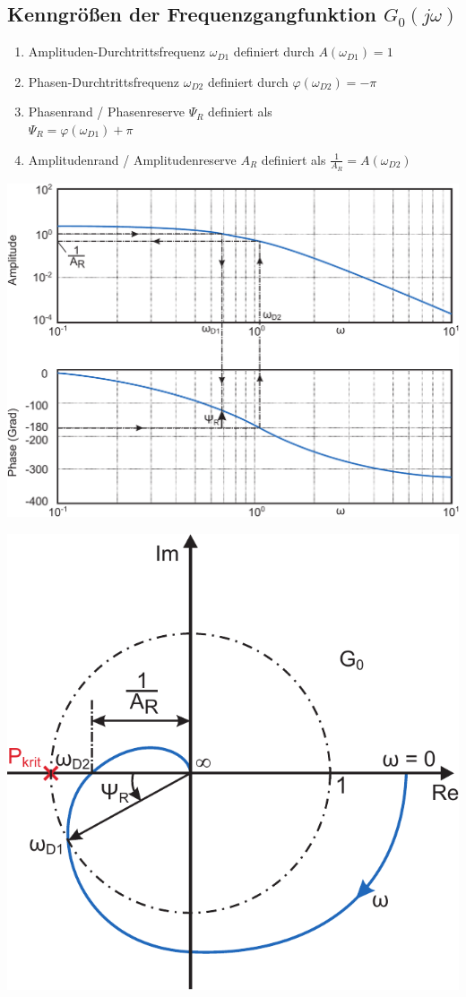 \documentclass[a4paper,twocolumn,10pt]{article}
\begin{document}
\subsection{Kenngrößen der Frequenzgangfunktion $G_0(j\omega)$}
\begin{enumerate}[label=$\bullet$]
\item Amplituden-Durchtrittsfrequenz $\omega_{D1}$ definiert durch $A(\omega_{D1})=1$
\item Phasen-Durchtrittsfrequenz $\omega_{D2}$ definiert durch $\varphi(\omega_{D2})=-\pi$
\item Phasenrand / Phasenreserve $\Psi_R$ definiert als\\
$\Psi_R=\varphi(\omega_{D1})+\pi$
\item Amplitudenrand / Amplitudenreserve $A_R$ definiert als $\frac{1}{A_R}=A(\omega_{D2})$
\end{enumerate}
\begin{center}
\includegraphics[width=0.95\columnwidth]{Grafiken/Kenngroessen_Bodediagramm}
\end{center}
\begin{center}
\includegraphics[width=0.6\columnwidth]{Grafiken/Kenngroessen_Ortskurve}
\end{center}
\end{document}
